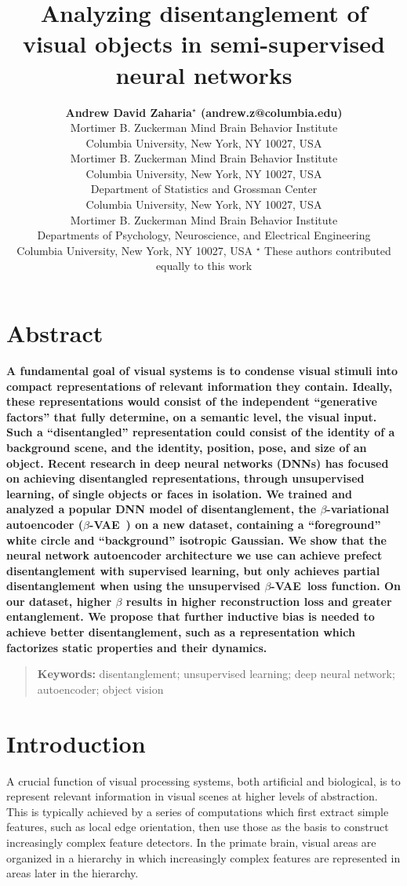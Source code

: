\documentclass[10pt,letterpaper]{article}
\title{Analyzing disentanglement of visual objects in semi-supervised neural networks}
\author{{\large \bf Andrew David Zaharia$^\star$ (andrew.z@columbia.edu)} \\
  Mortimer B. Zuckerman Mind Brain Behavior Institute\\
  Columbia University, New York, NY 10027, USA
  \AND {\large \bf Benjamin Peters$^\star$ (benjamin.peters@columbia.edu)} \\
  Mortimer B. Zuckerman Mind Brain Behavior Institute\\
  Columbia University, New York, NY 10027, USA
  \AND {\large \bf John Cunningham (jpc2181@columbia.edu)} \\
  Department of Statistics and Grossman Center\\
  Columbia University, New York, NY 10027, USA
  \AND {\large \bf Nikolaus Kriegeskorte (n.kriegeskorte@columbia.edu)} \\
  Mortimer B. Zuckerman Mind Brain Behavior Institute\\ Departments of Psychology, Neuroscience, and Electrical Engineering\\
  Columbia University, New York, NY 10027, USA
  \AND $^\star$ These authors contributed equally to this work}
\newcommand{\bvae}{$\beta$-VAE~}
\begin{document}
\maketitle

\section{Abstract}
{
\bf
A fundamental goal of visual systems is to condense visual stimuli into compact representations of relevant information they contain. Ideally, these representations would consist of the independent ``generative factors'' that fully determine, on a semantic level, the visual input. Such a ``disentangled'' representation could consist of the identity of a background scene, and the identity, position, pose, and size of an object. Recent research in deep neural networks (DNNs) has focused on achieving disentangled representations, through unsupervised learning, of single objects or faces in isolation. We trained and analyzed a popular DNN model of disentanglement, the $\beta$-variational autoencoder (\bvae) on a new dataset, containing a ``foreground'' white circle and ``background'' isotropic Gaussian. We show that the neural network autoencoder architecture we use can achieve prefect disentanglement with supervised learning, but only achieves partial disentanglement when using the unsupervised \bvae loss function. On our dataset, higher $\beta$ results in higher reconstruction loss and greater entanglement. We propose that further inductive bias is needed to achieve better disentanglement, such as a representation which factorizes static properties and their dynamics.
}
\begin{quote}
\small
\textbf{Keywords:} 
disentanglement; unsupervised learning; deep neural network; autoencoder; object vision
\end{quote}


\section{Introduction}

A crucial function of visual processing systems, both artificial and biological, is to represent relevant information in visual scenes at higher levels of abstraction. This is typically achieved by a series of computations which first extract simple features, such as local edge orientation, then use those as the basis to construct increasingly complex feature detectors. In the primate brain, visual areas are organized in a hierarchy in which increasingly complex features are represented in areas later in the hierarchy.
\end{document}
